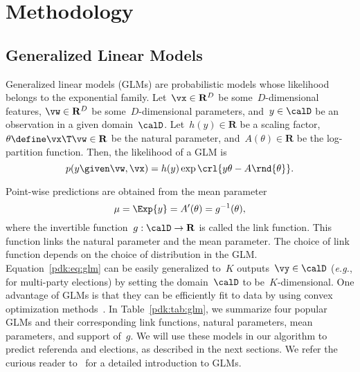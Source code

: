 \section{Methodology}%
\label{pdk:sec:methodology}


\subsection{Generalized Linear Models}%
Generalized linear models (GLMs) are probabilistic models whose likelihood belongs to the exponential family.
Let~$\vx \in \mathbf{R}^D$ be some~$D$-dimensional features, $\vw \in \mathbf{R}^D$ be some~$D$-dimensional parameters, and~$y \in \calD$ be an observation in a given domain~$\calD$.
Let~$h(y) \in \mathbf{R}$ be a scaling factor, $\theta \define \vx\T \vw \in \mathbf{R}$ be the natural parameter, and~$A(\theta) \in \mathbf{R}$ be the log-partition function.
Then, the likelihood of a GLM is
\begin{equation}
	\label{pdk:eq:glm}
	p(y \given \vw, \vx) = h(y) \exp{\crl{y \theta - A \rnd{\theta}}}.
\end{equation}

Point-wise predictions are obtained from the mean parameter
\begin{equation*}
	\mu = \Exp{y} = A'(\theta) = g^{-1}(\theta),
\end{equation*}
where the invertible function~$g : \calD \rightarrow \mathbf{R}$ is called the link function.
This function links the natural parameter and the mean parameter.
The choice of link function depends on the choice of distribution in the GLM.
Equation~\eqref{pdk:eq:glm} can be easily generalized to~$K$ outputs~$\vy \in \calD$ (\textit{e.g.}, for multi-party elections) by setting the domain~$\calD$ to be~$K$-dimensional.
One advantage of GLMs is that they can be efficiently fit to data by using convex optimization methods~\cite{boyd2004convex}.
In Table~\ref{pdk:tab:glm}, we summarize four popular GLMs and their corresponding link functions, natural parameters, mean parameters, and support of~$g$.
We will use these models in our algorithm to predict referenda and elections, as described in the next sections.
We refer the curious reader to~\citet[Chapter~9]{murphy2012machine} for a detailed introduction to GLMs.

